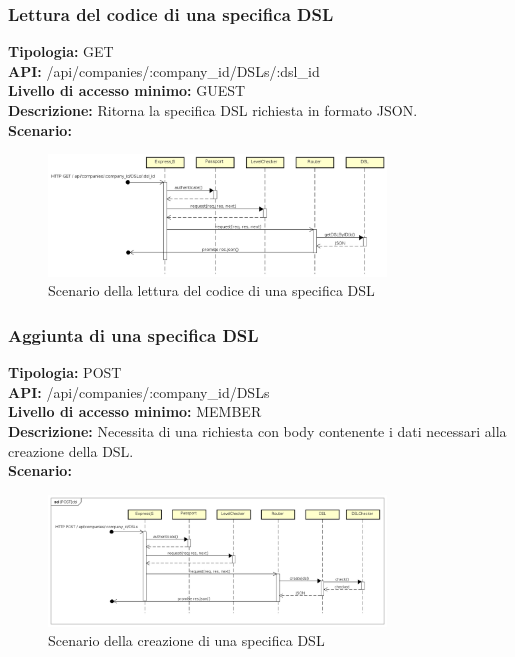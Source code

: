 \newpage
\subsubsection{Lettura del codice di una specifica DSL}
\textbf{Tipologia:} GET \\
\textbf{API:} /api/companies/:company\_id/DSLs/:dsl\_id \\
\textbf{Livello di accesso minimo:} GUEST \\
\textbf{Descrizione:} Ritorna la specifica DSL richiesta in formato JSON. \\
\textbf{Scenario:} 
\begin{figure}[h]
\centering
\includegraphics[width=0.8\textwidth]{res/sections/backend/(GET)dslByID.png}
\caption{Scenario della lettura del codice di una specifica DSL}
\end{figure}

\newpage
\subsubsection{Aggiunta di una specifica DSL}
\textbf{Tipologia:} POST \\
\textbf{API:} /api/companies/:company\_id/DSLs \\
\textbf{Livello di accesso minimo:} MEMBER \\
\textbf{Descrizione:} Necessita di una richiesta con body contenente i dati necessari alla creazione della DSL. \\
\textbf{Scenario:} 
\begin{figure}[h]
\centering
\includegraphics[width=0.8\textwidth]{res/sections/backend/(POST)dsl.png}
\caption{Scenario della creazione di una specifica DSL}
\end{figure}

